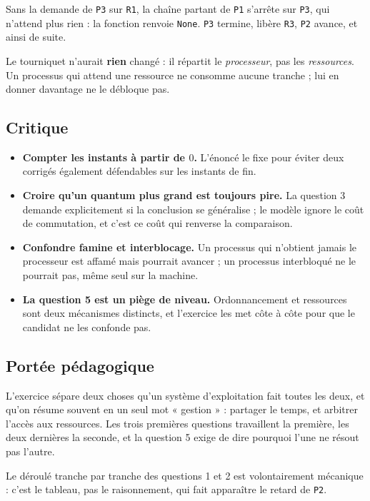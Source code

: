 Sans la demande de \texttt{P3} sur \texttt{R1}, la chaîne partant de
\texttt{P1} s'arrête sur \texttt{P3}, qui n'attend plus rien : la fonction
renvoie \lstinline{None}. \texttt{P3} termine, libère \texttt{R3},
\texttt{P2} avance, et ainsi de suite.

Le tourniquet n'aurait \textbf{rien} changé : il répartit le \emph{processeur},
pas les \emph{ressources}. Un processus qui attend une ressource ne consomme
aucune tranche ; lui en donner davantage ne le débloque pas.

\subsection*{Critique}

\begin{itemize}
  \item \textbf{Compter les instants à partir de $0$.} L'énoncé le fixe pour
    éviter deux corrigés également défendables sur les instants de fin.
  \item \textbf{Croire qu'un quantum plus grand est toujours pire.} La question
    3 demande explicitement si la conclusion se généralise ; le modèle ignore le
    coût de commutation, et c'est ce coût qui renverse la comparaison.
  \item \textbf{Confondre famine et interblocage.} Un processus qui n'obtient
    jamais le processeur est affamé mais pourrait avancer ; un processus
    interbloqué ne le pourrait pas, même seul sur la machine.
  \item \textbf{La question 5 est un piège de niveau.} Ordonnancement et
    ressources sont deux mécanismes distincts, et l'exercice les met côte à côte
    pour que le candidat ne les confonde pas.
\end{itemize}

\subsection*{Portée pédagogique}

L'exercice sépare deux choses qu'un système d'exploitation fait toutes les
deux, et qu'on résume souvent en un seul mot « gestion » : partager le temps,
et arbitrer l'accès aux ressources. Les trois premières questions travaillent
la première, les deux dernières la seconde, et la question 5 exige de dire
pourquoi l'une ne résout pas l'autre.

Le déroulé tranche par tranche des questions 1 et 2 est volontairement
mécanique : c'est le tableau, pas le raisonnement, qui fait apparaître le
retard de \texttt{P2}.

